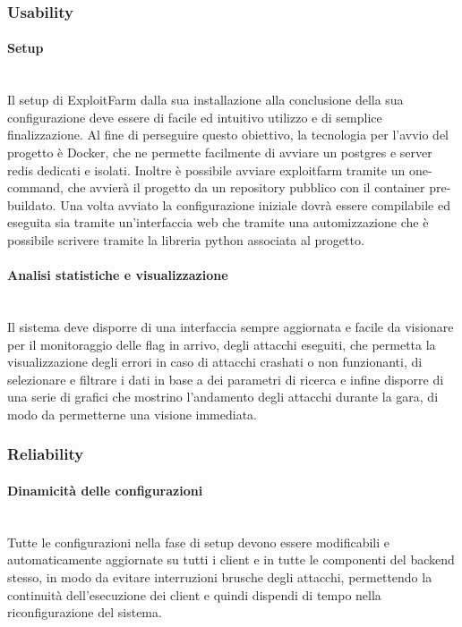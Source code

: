 \documentclass[11pt]{article}
\begin{document}
\subsubsection{Usability}
\paragraph{Setup}\mbox{}\\
Il setup di ExploitFarm dalla sua installazione alla conclusione della sua configurazione deve essere di facile ed intuitivo utilizzo e di semplice finalizzazione. Al fine di perseguire questo obiettivo, la tecnologia per l'avvio del progetto è Docker, che ne permette facilmente di avviare un postgres e server redis dedicati e isolati. Inoltre è possibile avviare exploitfarm tramite un one-command, che avvierà il progetto da un repository pubblico con il container pre-buildato. Una volta avviato la configurazione iniziale dovrà essere compilabile ed eseguita sia tramite un'interfaccia web che tramite una automizzazione che è possibile scrivere tramite la libreria python associata al progetto.
\paragraph{Analisi statistiche e visualizzazione}\mbox{}\\
Il sistema deve disporre di una interfaccia sempre aggiornata e facile da visionare per il monitoraggio delle flag in arrivo, degli attacchi eseguiti, che permetta la visualizzazione degli errori in caso di attacchi crashati o non funzionanti, di selezionare e filtrare i dati in base a dei parametri di ricerca e infine disporre di una serie di grafici che mostrino l'andamento degli attacchi durante la gara, di modo da permetterne una visione immediata.
\subsubsection{Reliability}
\paragraph{Dinamicità delle configurazioni}\mbox{}\\
Tutte le configurazioni nella fase di setup devono essere modificabili e automaticamente aggiornate su tutti i client e in tutte le componenti del backend stesso, in modo da evitare interruzioni brusche degli attacchi, permettendo la continuità dell'esecuzione dei client e quindi dispendi di tempo nella riconfigurazione del sistema.
\end{document}
